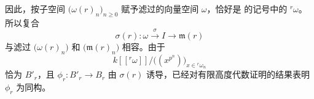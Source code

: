 因此，按子空间 \(\bigl(\omega(r)_n\bigr)_{n\geq0}\) 赋予滤过的向量空间 \(\omega\)，恰好是  的记号中的 \({}^{r}\omega\)。所以复合
\[
  \sigma(r):
  \omega\xrightarrow{\ \sigma\ }I
  \longrightarrow\mathfrak m(r)
\]
与滤过 \(\bigl(\omega(r)_n\bigr)\) 和 \(\bigl(\mathfrak m(r)_n\bigr)\) 相容。由于
\[
  k[[{}^{r}\omega]]
  \big/
  \bigl((x^{p^n})\bigr)_{x\in{}^{r}\omega_n}
\]
恰为 \(B'_r\)，且 \(\phi_r:B'_r\to B_r\) 由 \(\sigma(r)\) 诱导，已经对有限高度代数证明的结果表明 \(\phi_r\) 为同构。
